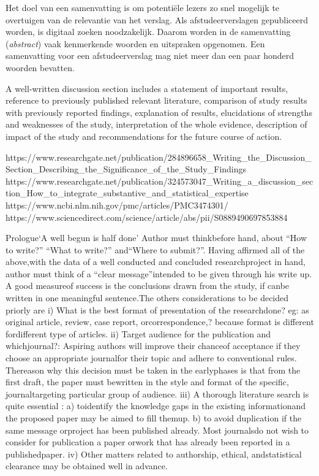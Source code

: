 \samenvatting

Het doel van een samenvatting is om potentiële lezers zo snel mogelijk
te overtuigen van de relevantie van het verslag. Als afstudeerverslagen
gepubliceerd worden, is digitaal zoeken noodzakelijk. Daarom worden in
de samenvatting (\emph{abstract}) vaak kenmerkende woorden en
uitspraken opgenomen. Een samenvatting voor een afstudeerverslag mag
niet meer dan een paar honderd woorden bevatten.


A well-written discussion section includes a statement of important results, reference to previously published relevant literature, comparison of study results with previously reported findings, explanation of results, elucidations of strengths and weaknesses of the study, interpretation of the whole evidence, description of impact of the study and recommendations for the future course of action.


https://www.researchgate.net/publication/284896658_Writing_the_Discussion_Section_Describing_the_Significance_of_the_Study_Findings
https://www.researchgate.net/publication/324573047_Writing_a_discussion_section_How_to_integrate_substantive_and_statistical_expertise
https://www.ncbi.nlm.nih.gov/pmc/articles/PMC3474301/
https://www.sciencedirect.com/science/article/abs/pii/S0889490697853884


Prologue‘A well begun is half done’ Author must thinkbefore hand, about “How to write?” “What to write?” and“Where to submit?”. Having affirmed all of the above,with the data of a well conducted and concluded researchproject in hand, author must think of a “clear message”intended to be given through his write up. A good measureof success is the conclusions drawn from the study, if canbe written in one meaningful sentence.The others considerations to be decided priorly are
i) What is the best format of presentation of the researchdone? eg: as  original article, review, case report, orcorrespondence,? because format is different fordifferent type of articles.
ii) Target audience for the publication and whichjournal?: Aspiring authors will improve their chanceof acceptance if they choose an appropriate journalfor their topic and adhere to conventional rules. Thereason why this decision must be taken in the earlyphases is that from the first draft, the paper must bewritten in the style and format of the specific, journaltargeting particular group of audience.
iii) A thorough literature search is quite essential : 
a) toidentify the knowledge gaps in the existing informationand the proposed paper may be aimed to fill themup. 
b) to avoid duplication if the same message orproject has been published already.  Most journalsdo not wish to consider for publication a paper orwork that has already been reported in a publishedpaper.
iv) Other matters related to authorship, ethical,  andstatistical clearance may be obtained well in advance.



